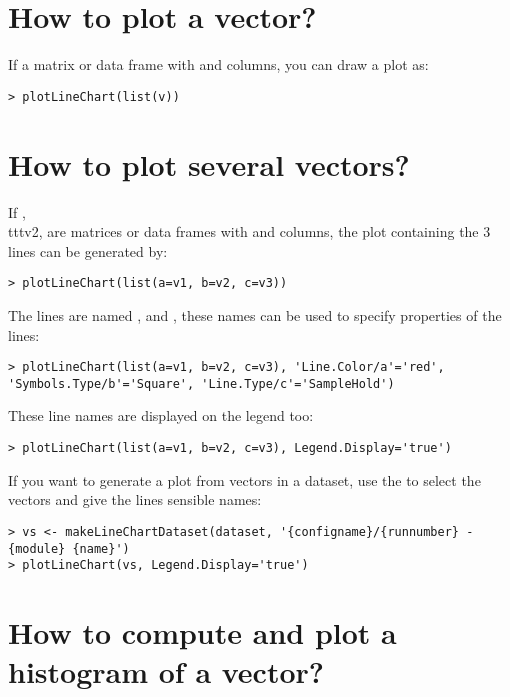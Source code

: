 
\section{How to plot a vector?}

If  a matrix or data frame with  and  columns, you can draw a plot as:

\begin{verbatim}
> plotLineChart(list(v))
\end{verbatim}

\section{How to plot several vectors?}

If , \\ttt{v2},  are matrices or data frames with  and  columns,
the plot containing the 3 lines can be generated by:

\begin{verbatim}
> plotLineChart(list(a=v1, b=v2, c=v3))
\end{verbatim}

The lines are named ,  and , these names can be used to specify
properties of the lines:

\begin{verbatim}
> plotLineChart(list(a=v1, b=v2, c=v3), 'Line.Color/a'='red', 'Symbols.Type/b'='Square', 'Line.Type/c'='SampleHold')
\end{verbatim}

These line names are displayed on the legend too:

\begin{verbatim}
> plotLineChart(list(a=v1, b=v2, c=v3), Legend.Display='true')
\end{verbatim}

If you want to generate a plot from vectors in a dataset, use the  to select
the vectors and give the lines sensible names:

\begin{verbatim}
> vs <- makeLineChartDataset(dataset, '{configname}/{runnumber} - {module} {name}')
> plotLineChart(vs, Legend.Display='true')
\end{verbatim}

\section{How to compute and plot a histogram of a vector?}

